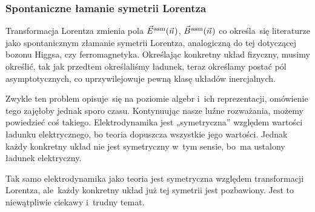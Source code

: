 \documentclass[10pt,t]{beamer}
\begin{document}
\begin{frame}
  \frametitle{Spontaniczne łamanie symetrii Lorentza}


  Transformacja Lorentza zmienia pola $\vec{E}^{ \hspace{0.05em} \text{asm} }( \vec{n} \hspace{0.05em} )$, $\vec{B}^{ \hspace{0.05em} \text{asm} }( \vec{n} \hspace{0.05em} )$ co określa~się
  literaturze jako spontanicznym złamanie symetrii Lorentza, analogiczną do
  tej dotyczącej bozonu Higgsa, czy ferromagnetyka. Określając konkretny
  układ fizyczny, musimy określić, tak jak przedtem określaliśmy ładunek,
  teraz określamy postać pól asymptotycznych, co uprzywilejowuje pewną klasę
  układów inercjalnych.

  Zwykle ten problem opisuje~się na poziomie algebr i~ich reprezentacji,
  omówienie tego zajęłoby jednak sporo czasu. Kontynuując nasze luźne
  rozważania, możemy powiedzieć coś takiego. Elektrodynamika jest
  „symetryczna” względem wartości ładunku elektrycznego, bo teoria dopuszcza
  wszystkie jego wartości. Jednak każdy konkretny \alert{układ} nie jest
  symetryczny w~tym sensie, bo~ma ustalony ładunek elektryczny.

  Tak samo elektrodynamika jako teoria jest symetryczna względem
  transformacji Lorentza, ale~każdy konkretny układ już tej symetrii jest
  pozbawiony. Jest to niewątpliwie ciekawy i~trudny temat.

\end{frame}
\end{document}
